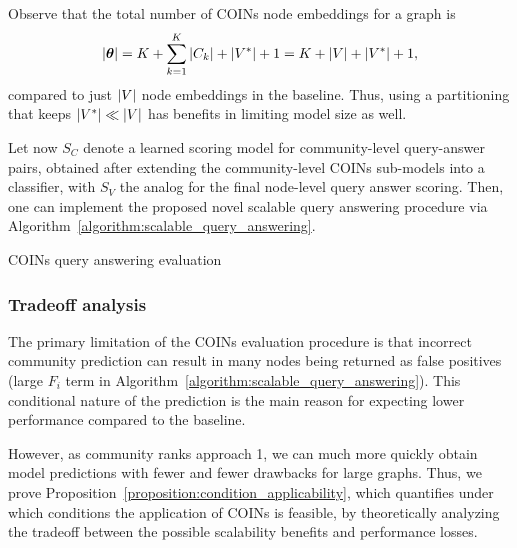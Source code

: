 Observe that the total number of COINs node embeddings for a graph is 
\begin{equation}
    \mathopen{}\left|\boldsymbol{\theta}\right| = K + \sum_{k=1}^{K}{\mathopen{}\left|C_k\right|} + \mathopen{}\left|V^*\right| + 1 = K + \mathopen{}\left|V\right| + \mathopen{}\left|V^*\right| + 1,
\end{equation}
compared to just $\mathopen{}\left|V\right|$ node embeddings in the baseline. Thus, using a partitioning that keeps $\mathopen{}\left|V^*\right| \ll \mathopen{}\left|V\right|$ has benefits in limiting model size as well. 

Let now $S_C$ denote a learned scoring model for community-level query-answer pairs, obtained after extending the community-level COINs sub-models into a classifier, with $S_V$ the analog for the final node-level query answer scoring. Then, one can implement the proposed novel scalable query answering procedure via Algorithm~\ref{algorithm:scalable_query_answering}.

\begin{algorithm}[H]
\caption{COINs query answering evaluation}
\label{algorithm:scalable_query_answering}
\begin{algorithmic}[1]
\ENDFOR
{}
\end{algorithmic}
\end{algorithm} 

\subsubsection{Tradeoff analysis}

The primary limitation of the COINs evaluation procedure is that incorrect community prediction can result in many nodes being returned as false positives (large $F_i$ term in Algorithm~\ref{algorithm:scalable_query_answering}). This conditional nature of the prediction is the main reason for expecting lower performance compared to the baseline. 

However, as community ranks approach 1, we can much more quickly obtain model predictions with fewer and fewer drawbacks for large graphs. Thus, we prove Proposition~\ref{proposition:condition_applicability}, which quantifies under which conditions the application of COINs is feasible, by theoretically analyzing the tradeoff between the possible scalability benefits and performance losses. 


